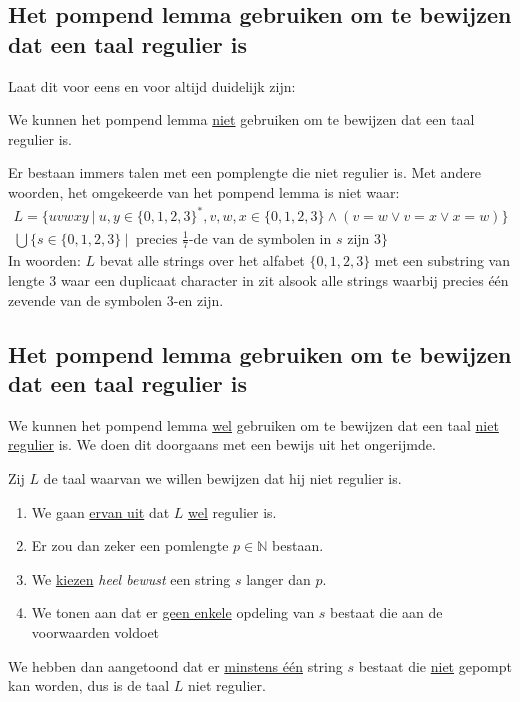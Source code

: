 \documentclass[main.tex]{subfiles}
\begin{document}
\subsection{Het pompend lemma gebruiken om te bewijzen dat een taal regulier is}
Laat dit voor eens en voor altijd duidelijk zijn:
\begin{center}
  We kunnen het pompend lemma \underline{niet} gebruiken om te bewijzen dat een taal regulier is.
\end{center}
Er bestaan immers talen met een pomplengte die niet regulier is.
Met andere woorden, het omgekeerde van het pompend lemma is niet waar:
\[ 
\begin{array}{c}
  L = \{ uvwxy\ |\ u,y \in \{0,1,2,3\}^{*}, v,w,x\in \{0,1,2,3\} \wedge (v=w \vee v=x \vee x=w)\}\\
  \bigcup \{ s \in \{0,1,2,3\}\ |\ \text{ precies } \frac{1}{7} \text{-de van de symbolen in } s \text{ zijn } 3 \}  
\end{array}
\]
In woorden: $L$ bevat alle strings over het alfabet $\{0,1,2,3\}$ met een substring van lengte $3$ waar een duplicaat character in zit alsook alle strings waarbij precies \'e\'en zevende van de symbolen $3$-en zijn.

\subsection{Het pompend lemma gebruiken om te bewijzen dat een taal regulier is}
We kunnen het pompend lemma \underline{wel} gebruiken om te bewijzen dat een taal \underline{niet regulier} is.
We doen dit doorgaans met een bewijs uit het ongerijmde.

Zij $L$ de taal waarvan we willen bewijzen dat hij niet regulier is.
\begin{enumerate}
\item We gaan \underline{ervan uit} dat $L$ \underline{wel} regulier is.
\item Er zou dan zeker een pomlengte $p\in \mathbb{N}$ bestaan.
\item We \underline{kiezen} \emph{heel bewust} een string $s$ langer dan $p$.
\item We tonen aan dat er \underline{geen enkele} opdeling van $s$ bestaat die aan de voorwaarden voldoet
\end{enumerate}
We hebben dan aangetoond dat er \underline{minstens \'e\'en} string $s$ bestaat die \underline{niet} gepompt kan worden, dus is de taal $L$ niet regulier.
\end{document}
